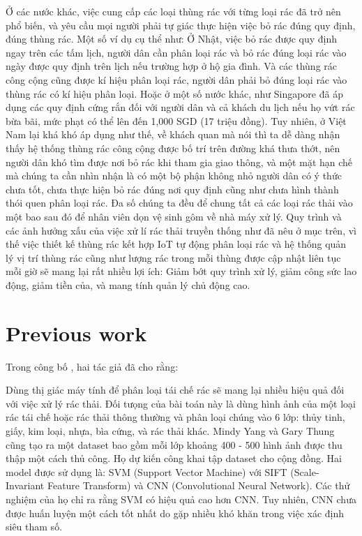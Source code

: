 Ở các nước khác, việc cung cấp các loại thùng rác với từng loại rác đã trở nên phổ biến, và yêu cầu mọi người phải tự giác thực hiện việc bỏ rác đúng quy định, đúng thùng rác. Một số ví dụ cụ thể như:
Ở Nhật, việc bỏ rác được quy định ngay trên các tấm lịch, người dân cần phân loại rác và bỏ rác đúng loại rác vào ngày được quy định trên lịch nếu trường hợp ở hộ gia đình. Và các thùng rác công cộng cũng được kí hiệu phân loại rác, người dân phải bỏ đúng loại rác vào thùng rác có kí hiệu phân loại. Hoặc ở một số nước khác, như Singapore đã áp dụng các quy định cứng rắn đối với người dân và cả khách du lịch nếu họ vứt rác bừa bãi, mức phạt có thể lên đến 1,000 SGD (17 triệu đồng). Tuy nhiên, ở Việt Nam lại khá khó áp dụng như thế, về khách quan mà nói thì ta dễ dàng nhận thấy hệ thống thùng rác công cộng được bố trí trên đường khá thưa thớt, nên người dân khó tìm được nơi bỏ rác khi tham gia giao thông, và một mặt hạn chế mà chúng ta cần nhìn nhận là có một bộ phận không nhỏ người dân có ý thức chưa tốt, chưa thực hiện bỏ rác đúng nơi quy định cũng như chưa hình thành thói quen phân loại rác. Đa số  chúng ta đều để chung tất cả các loại rác thải vào một bao sau đó để nhân viên dọn vệ sinh gôm về nhà máy xử lý. Quy trình và các ảnh hưởng xấu của việc xử lí rác thải truyền thống như đã nêu ở mục trên, vì thế việc thiết kế thùng rác kết hợp IoT tự động phân loại rác và hệ thống quản lý vị trí thùng rác cũng như lượng rác trong mỗi thùng được cập nhật liên tục mỗi giờ sẽ mang lại rất nhiều lợi ích: Giảm bớt quy trình xử lý, giảm công sức lao động, giảm tiền của, và mang tính quản lý chủ động cao.



\section{Previous work}

Trong công bố  \cite{trashnet}, hai tác giả đã cho rằng:

Dùng thị giác máy tính để phân loại tái chế rác sẽ mang lại nhiều hiệu quả đối với việc xử lý rác thải. Đối tưọng của bài toán này là dùng hình ảnh của một loại rác tái chế hoặc rác thải thông thường và phân loại chúng vào 6 lớp: thủy tinh, giấy, kim loại, nhựa, bìa cứng, và rác thải khác. Mindy Yang và Gary Thung cũng tạo ra một dataset bao gồm mỗi lớp khoảng 400 - 500 hình ảnh được thu thập một cách thủ công. Họ dự kiến công khai tập dataset cho cộng đồng. Hai model được sử dụng là: SVM (Support Vector Machine) với SIFT (Scale-Invariant Feature Transform) và CNN (Convolutional Neural Network). Các thử nghiệm của họ chỉ ra rằng SVM có hiệu quả cao hơn CNN. Tuy nhiên, CNN chưa được huấn luyện một cách tốt nhất do gặp nhiều khó khăn trong việc xác định siêu tham số.

